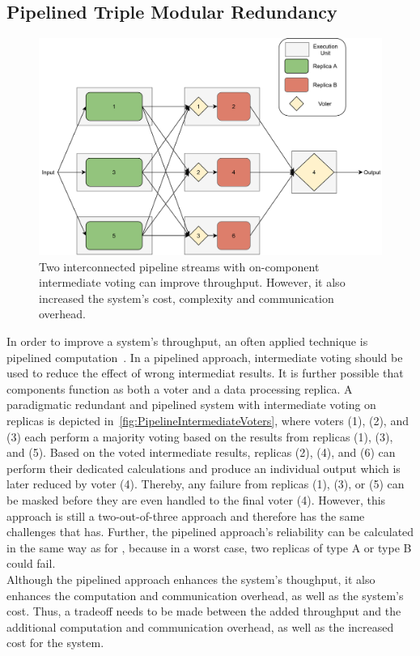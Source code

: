 \subsection{Pipelined Triple Modular Redundancy}
\begin{figure}[!hb]
	\centering
	\includegraphics[width=0.75\linewidth]{images/InterconnectedVoterPipeline}
	\caption{Two interconnected pipeline streams with on-component intermediate voting can improve throughput. However, it also increased the system's cost, complexity and communication overhead.}
	\label{fig:PipelineIntermediateVoters}
\end{figure}

In order to improve a system's throughput, an often applied technique is pipelined computation~\cite{TanenbaumSteen07}.
In a pipelined approach, intermediate voting should be used to reduce the effect of wrong intermediat results.
It is further possible that components function as both a voter and a data processing replica.
A paradigmatic redundant and pipelined system with intermediate voting on replicas is depicted in~\autoref{fig:PipelineIntermediateVoters}, where voters (1), (2), and (3) each perform a majority voting based on the results from replicas (1), (3), and (5).
Based on the voted intermediate results, replicas (2), (4), and (6) can perform their dedicated calculations and produce an individual output which is later reduced by voter (4).
Thereby, any failure from replicas (1), (3), or (5) can be masked before they are even handled to the final voter (4).
However, this approach is still a two-out-of-three approach and therefore has the same challenges that  has.
Further, the pipelined approach's reliability can be calculated in the same way as for , because in a worst case, two replicas of type A or type B could fail.
\\

Although the pipelined approach enhances the system's thoughput, it also enhances the computation and communication overhead, as well as the system's cost.
Thus, a tradeoff needs to be made between the added throughput and the additional computation and communication overhead, as well as the increased cost for the system.

